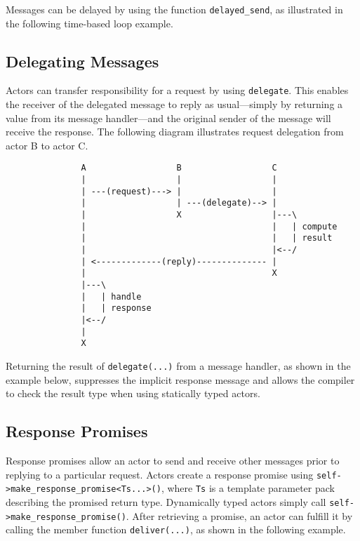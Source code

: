 Messages can be delayed by using the function \lstinline^delayed_send^, as illustrated in the following time-based loop example. 



\clearpage
\subsection{Delegating Messages}
\label{delegate}

Actors can transfer responsibility for a request by using \lstinline^delegate^. This enables the receiver of the delegated message to reply as usual---simply by returning a value from its message handler---and the original sender of the message will receive the response. The following diagram illustrates request delegation from actor B to actor C.

\begin{footnotesize}
\begin{verbatim}
               A                  B                  C
               |                  |                  |
               | ---(request)---> |                  |
               |                  | ---(delegate)--> |
               |                  X                  |---\
               |                                     |   | compute
               |                                     |   | result
               |                                     |<--/
               | <-------------(reply)-------------- |
               |                                     X
               |---\
               |   | handle
               |   | response
               |<--/
               |
               X
\end{verbatim}
\end{footnotesize}

Returning the result of \lstinline^delegate(...)^ from a message handler, as shown in the example below, suppresses the implicit response message and allows the compiler to check the result type when using statically typed actors.



\subsection{Response Promises}
\label{promise}

Response promises allow an actor to send and receive other messages prior to replying to a particular request. Actors create a response promise using \lstinline^self->make_response_promise<Ts...>()^, where \lstinline^Ts^ is a template parameter pack describing the promised return type. Dynamically typed actors simply call \lstinline^self->make_response_promise()^. After retrieving a promise, an actor can fulfill it by calling the member function \lstinline^deliver(...)^, as shown in the following example.

